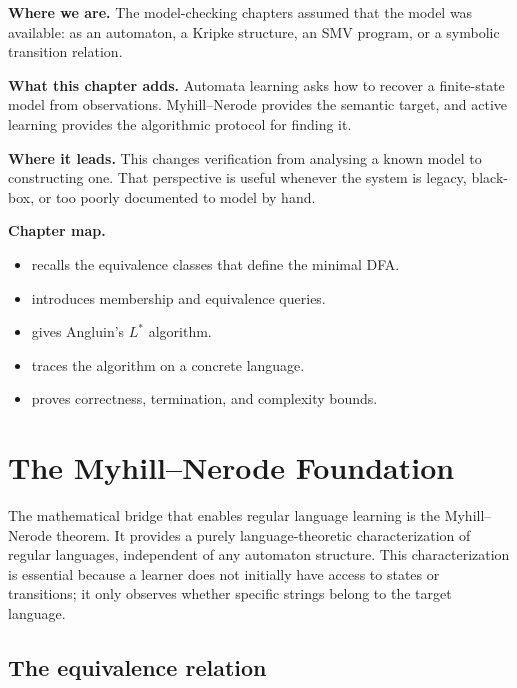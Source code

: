 \begin{chapteropening}
\textbf{Where we are.}  The model-checking chapters assumed that the model was
available: as an automaton, a Kripke structure, an SMV program, or a symbolic
transition relation.

\textbf{What this chapter adds.}  Automata learning asks how to recover a
finite-state model from observations.  Myhill--Nerode provides the semantic
target, and active learning provides the algorithmic protocol for finding it.

\textbf{Where it leads.}  This changes verification from analysing a known
model to constructing one.  That perspective is useful whenever the system is
legacy, black-box, or too poorly documented to model by hand.

\textbf{Chapter map.}
\begin{itemize}[nosep]
  \item {} recalls the equivalence classes that
        define the minimal DFA.
  \item {} introduces membership and equivalence
        queries.
  \item {} gives Angluin's $L^*$ algorithm.
  \item {} traces the algorithm on a concrete
        language.
  \item {} proves correctness, termination, and
        complexity bounds.
\end{itemize}
\end{chapteropening}

\section{The Myhill--Nerode Foundation}
\label{sec:myhill-nerode-learning}

The mathematical bridge that enables regular language learning is the Myhill--Nerode theorem. It provides a purely language-theoretic characterization of regular languages, independent of any automaton structure. This characterization is essential because a learner does not initially have access to states or transitions; it only observes whether specific strings belong to the target language.

\subsection{The equivalence relation}


